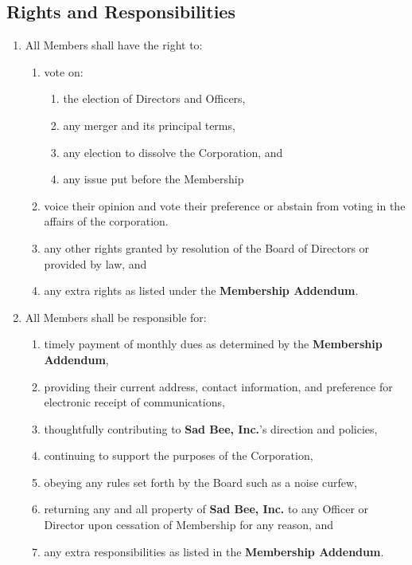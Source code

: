 \documentclass{article}
\begin{document}
\subsection{Rights and Responsibilities}
\begin{enumerate}
    \item All Members shall have the right to:
    \begin{enumerate}
        \item vote on:
        \begin{enumerate}
            \item the election of Directors and Officers,
            \item any merger and its principal terms,
            \item any election to dissolve the Corporation, and
            \item any issue put before the Membership
        \end{enumerate}
        \item voice their opinion and vote their preference or abstain from
        voting in the affairs of the corporation.
        \item any other rights granted by resolution of the Board of Directors or provided by law, and
        \item any extra rights as listed under the \textbf{Membership Addendum}.
    \end{enumerate}
    \item All Members shall be responsible for:
    \begin{enumerate}
        \item timely payment of monthly dues as determined by the \textbf{Membership Addendum},
        \item providing their current address, contact information, and
        preference for electronic receipt of communications,
        \item thoughtfully contributing to \textbf{Sad Bee, Inc.}'s direction and
    policies,
        \item continuing to support the purposes of the Corporation,
        \item obeying any rules set forth by the Board such as a noise curfew,
        \item returning any and all property of \textbf{Sad Bee, Inc.} to any Officer or Director upon cessation of Membership for any reason, and
        \item any extra responsibilities as listed in the \textbf{Membership Addendum}.
    \end{enumerate}
\end{enumerate}
\end{document}
